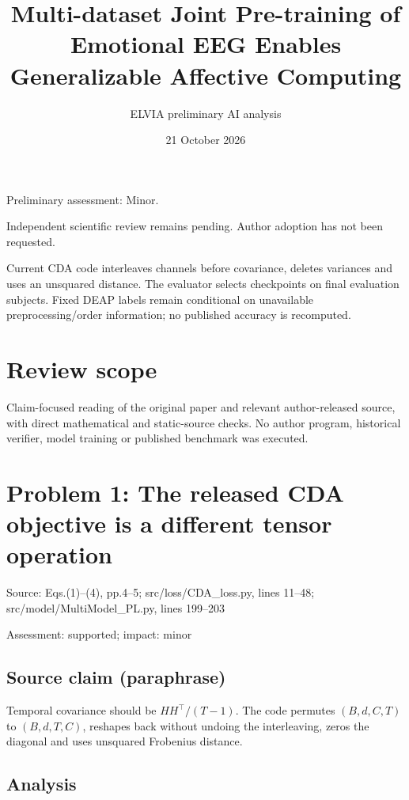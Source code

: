 \documentclass[11pt]{article}
\begin{document}
\title{Multi-dataset Joint Pre-training of Emotional EEG Enables Generalizable Affective Computing}

\author{ELVIA preliminary AI analysis}\date{21 October 2026}\maketitle

Preliminary assessment: Minor.\par

Independent scientific review remains pending. Author adoption has not been requested.

Current CDA code interleaves channels before covariance, deletes variances and uses an unsquared distance. The evaluator selects checkpoints on final evaluation subjects. Fixed DEAP labels remain conditional on unavailable preprocessing/order information; no published accuracy is recomputed.

\section*{Review scope}

Claim-focused reading of the original paper and relevant author-released source, with direct mathematical and static-source checks. No author program, historical verifier, model training or published benchmark was executed.

\section*{Problem 1: The released CDA objective is a different tensor operation}

Source: Eqs.(1)–(4), pp.4–5; src/loss/CDA\_loss.py, lines 11–48; src/model/MultiModel\_PL.py, lines 199–203

Assessment: supported; impact: minor

\subsection*{Source claim (paraphrase)}

Temporal covariance should be \(HH^{\top}/(T-1)\). The code permutes \((B,d,C,T)\) to \((B,d,T,C)\), reshapes back without undoing the interleaving, zeros the diagonal and uses unsquared Frobenius distance.

\subsection*{Analysis}
\end{document}
